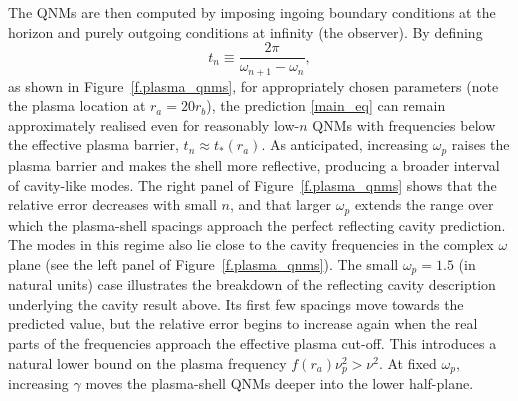 \documentclass[prd,aps,twocolumn,amsfonts,showpacs,superscriptaddress,preprintnumbers,nofootinbib]{revtex4-2}
\begin{document}
The QNMs are then computed by imposing ingoing boundary conditions at the horizon and purely outgoing conditions at infinity (the observer). By defining
\begin{equation}
\label{eq:tn}
    t_n \equiv \frac{2\pi}{\omega_{n+1}-\omega_n},
\end{equation}
as shown in Figure~\ref{f.plasma_qnms}, for appropriately chosen parameters (note the plasma location at $r_a = 20 r_b$), the prediction \eqref{main_eq} can remain approximately realised even for reasonably low-$n$ QNMs with frequencies below the effective plasma barrier, $t_n \approx t_*(r_a)$. As anticipated, increasing $\omega_p$ raises the plasma barrier and makes the
shell more reflective, producing a broader interval of cavity-like modes. The right panel of Figure~\ref{f.plasma_qnms} shows that the relative error decreases with small $n$, and that larger $\omega_p$ extends the range over which the plasma-shell spacings approach the perfect reflecting cavity prediction. The modes in this regime also lie close to the cavity frequencies in the complex $\omega$ plane (see the left panel of Figure~\ref{f.plasma_qnms}). The small $\omega_p=1.5$ (in natural units) case illustrates the breakdown of the reflecting cavity description underlying the cavity result above. Its first few spacings move towards the predicted value, but the relative error begins to increase again when the real parts of the frequencies approach the effective plasma cut-off. This introduces a natural lower bound on the plasma frequency $f(r_a)\nu^2_p>\nu^2$. At fixed $\omega_p$, increasing $\gamma$ moves the plasma-shell QNMs deeper into the lower half-plane.
\end{document}
